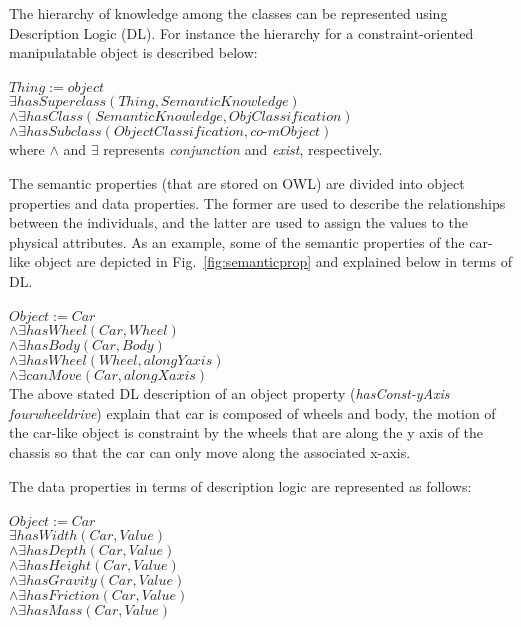 \documentclass[twocolumn]{svjour3}          %
\begin{document}
The hierarchy of knowledge among the classes can be represented using Description Logic (DL). For instance the hierarchy for a constraint-oriented manipulatable object is described below:\\
\\
$Thing:= object$\\ 
 $  \exists hasSuperclass (Thing, SemanticKnowledge)$\\
 $ \wedge \exists hasClass (SemanticKnowledge, ObjClassification)$\\
 $ \wedge \exists hasSubclass(ObjectClassification, co\textrm{-}mObject)$\\ 
 
 where $\wedge$ and $\exists$ represents \textit{conjunction} and \textit{exist}, respectively.
 
  
 The semantic properties (that are stored on OWL) are divided into object properties and data properties. The former are used to describe the relationships between the individuals, and the latter are used to assign the values to the physical attributes.  As an example, some of the semantic properties of the car-like object are depicted in  
Fig.~\ref{fig:semanticprop} and explained below in terms of DL.\\ 
\\
 $ Object:= Car$\\
 $ \wedge \exists hasWheel (Car, Wheel)$\\
 $ \wedge \exists hasBody (Car, Body)$\\
 $ \wedge \exists hasWheel (Wheel, alongYaxis)$\\
 $ \wedge \exists canMove (Car, alongXaxis)$\\

The above stated DL description of an object property (\textit{hasConst-yAxis fourwheeldrive}) explain that car is composed of wheels and body, the motion of the car-like object is constraint by the wheels that are along the y axis of the chassis so that the car can only move along the associated x-axis. 

The data properties in terms of description logic are represented as follows:\\
\\
 $Object:= Car$\\
 $  \exists hasWidth (Car, Value)$\\
 $ \wedge \exists hasDepth (Car, Value)$\\
 $ \wedge \exists hasHeight (Car, Value)$\\
 $ \wedge \exists hasGravity (Car, Value)$\\
 $ \wedge \exists hasFriction (Car, Value)$\\
 $ \wedge \exists hasMass (Car, Value)$\\
\end{document}
